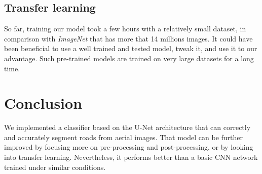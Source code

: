 \documentclass[10pt,conference,compsocconf]{IEEEtran}
\begin{document}
\subsection{Transfer learning}

So far, training our model took a few hours with a relatively small dataset, in comparison with \emph{ImageNet} that has more that 14 millions images. It could have been beneficial to use a well trained and tested model, tweak it, and use it to our advantage. Such pre-trained models are trained on very large datasets for a long time.

\section{Conclusion}

We implemented a classifier based on the U-Net architecture that can correctly and accurately segment roads from aerial images. That model can be further improved by focusing more on pre-processing and post-processing, or by looking into transfer learning. Nevertheless, it performs better than a basic CNN network trained under similar conditions.

\clearpage




\listoftodos



\nocite{*}
\end{document}
